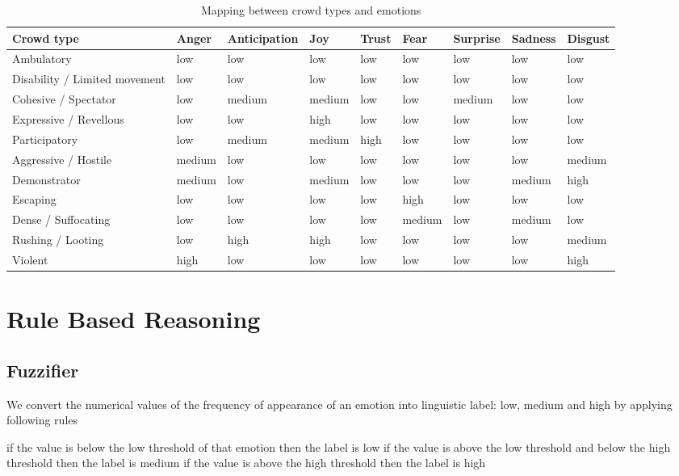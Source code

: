 \begin{table}
\caption{Mapping between crowd types and emotions}
\label{table:mappingEmotionCrowdType}
\begin{tabular}{|p{2cm}|p{1.2cm}|p{2cm}|p{1.2cm}|p{1.2cm}|p{1.2cm}|p{1.2cm}|p{1.2cm}|p{1.2cm}|}
\hline
\textbf{Crowd type} & \textbf{Anger} & \textbf{Anticipation} & \textbf{Joy} & \textbf{Trust} & \textbf{Fear} & \textbf{Surprise} & \textbf{Sadness} & \textbf{Disgust} \\
\hline
Ambulatory & low & low & low & low & low & low & low & low \\
\hline
Disability / Limited movement & low & low & low & low & low & low & low & low \\
\hline
Cohesive / Spectator & low & medium & medium & low & low & medium & low & low \\
\hline
Expressive / Revellous & low & low & high & low & low & low & low & low \\
\hline
Participatory & low & medium & medium & high & low & low & low & low \\
\hline
Aggressive / Hostile & medium & low & low & low & low & low & low & medium \\
\hline
Demonstrator & medium & low & medium & low & low & low & medium & high \\
\hline
Escaping & low & low & low & low & high & low & low & low \\
\hline
Dense / Suffocating	& low & low & low & low & medium & low & medium & low \\
\hline
Rushing	/ Looting & low & high & high & low & low & low & low & medium \\
\hline
Violent	& high & low & low & low & low & low & low & high \\
\hline
\end{tabular}
\end{table}

\section{Rule Based Reasoning}

\subsection{Fuzzifier}
We convert the numerical values of the frequency of appearance of an emotion into linguistic label: low, medium and high by applying following rules

if the value is below the low threshold of that emotion then the label is low
if the value is above the low threshold and below the high threshold then the label is medium
if the value is above the high threshold then the label is high

